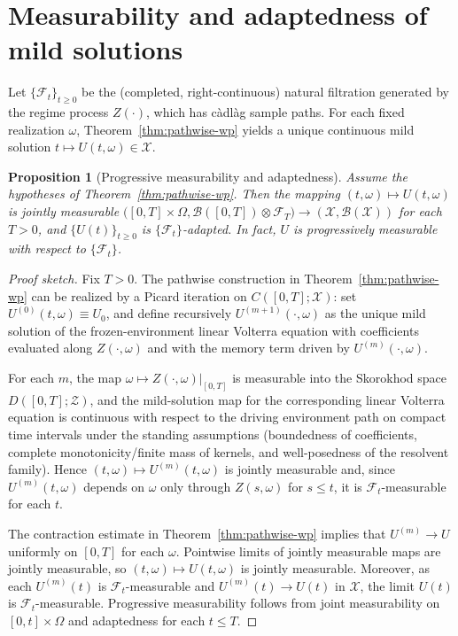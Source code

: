\documentclass[12pt,a4paper]{article}
\theoremstyle{plain}
\newtheorem{proposition}[theorem]{Proposition}
\theoremstyle{definition}
\theoremstyle{remark}
\begin{document}
	\section{Measurability and adaptedness of mild solutions}
	\label{app:adaptedness}
	
	Let $\{\mathcal F_t\}_{t\ge 0}$ be the (completed, right-continuous) natural filtration
	generated by the regime process $Z(\cdot)$, which has c\`adl\`ag sample paths.
	For each fixed realization $\omega$, Theorem~\ref{thm:pathwise-wp} yields a unique
	continuous mild solution $t\mapsto U(t,\omega)\in\mathcal X$.
	
	\begin{proposition}[Progressive measurability and adaptedness]
		\label{prop:adaptedness}
		Assume the hypotheses of Theorem~\ref{thm:pathwise-wp}.
		Then the mapping $(t,\omega)\mapsto U(t,\omega)$ is jointly measurable
		$\big([0,T]\times\Omega,\mathcal B([0,T])\otimes\mathcal F_T\big)\to(\mathcal X,\mathcal B(\mathcal X))$
		for each $T>0$, and $\{U(t)\}_{t\ge 0}$ is $\{\mathcal F_t\}$-adapted.
		In fact, $U$ is progressively measurable with respect to $\{\mathcal F_t\}$.
	\end{proposition}
	
	\begin{proof}[Proof sketch]
		Fix $T>0$.
		The pathwise construction in Theorem~\ref{thm:pathwise-wp} can be realized by a
		Picard iteration on $C([0,T];\mathcal X)$:
		set $U^{(0)}(t,\omega)\equiv U_0$, and define recursively $U^{(m+1)}(\cdot,\omega)$
		as the unique mild solution of the frozen-environment linear Volterra equation
		with coefficients evaluated along $Z(\cdot,\omega)$ and with the memory term
		driven by $U^{(m)}(\cdot,\omega)$.
		
		For each $m$, the map $\omega\mapsto Z(\cdot,\omega)\big|_{[0,T]}$ is measurable
		into the Skorokhod space $D([0,T];\mathcal Z)$, and the mild-solution map for the
		corresponding linear Volterra equation is continuous with respect to the driving
		environment path on compact time intervals under the standing assumptions
		(boundedness of coefficients, complete monotonicity/finite mass of kernels, and
		well-posedness of the resolvent family). Hence $(t,\omega)\mapsto U^{(m)}(t,\omega)$
		is jointly measurable and, since $U^{(m)}(t,\omega)$ depends on $\omega$ only
		through $Z(s,\omega)$ for $s\le t$, it is $\mathcal F_t$-measurable for each $t$.
		
		The contraction estimate in Theorem~\ref{thm:pathwise-wp} implies that
		$U^{(m)}\to U$ uniformly on $[0,T]$ for each $\omega$.
		Pointwise limits of jointly measurable maps are jointly measurable, so
		$(t,\omega)\mapsto U(t,\omega)$ is jointly measurable.
		Moreover, as each $U^{(m)}(t)$ is $\mathcal F_t$-measurable and $U^{(m)}(t)\to U(t)$
		in $\mathcal X$, the limit $U(t)$ is $\mathcal F_t$-measurable.
		Progressive measurability follows from joint measurability on $[0,t]\times\Omega$
		and adaptedness for each $t\le T$.
	\end{proof}
	
\end{document}
